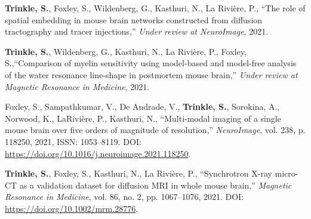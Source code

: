 \documentclass[10pt,letterpaper]{article}
\begin{document}
\begin{benumerate}{4}
\item \textbf{Trinkle, S.}, Foxley, S., Wildenberg, G., Kasthuri, N., La
  Rivi\`ere, P., ``The role of spatial embedding in mouse brain networks
  constructed from diffusion tractography and tracer injections,'' \textit{Under
    review at NeuroImage}, 2021.
\item \textbf{Trinkle, S.}, Wildenberg, G., Kasthuri, N., La Rivi\`ere, P.,
  Foxley, S.,``Comparison of myelin sensitivity using model-based and model-free
  analysis of the water resonance line-shape in postmortem mouse brain,''
  \textit{Under review at Magnetic Resonance in Medicine}, 2021.
\item Foxley, S., Sampathkumar, V., De Andrade, V., \textbf{Trinkle, S.},
  Sorokina, A., Norwood, K., LaRivi\`ere, P., Kasthuri, N., ``Multi-modal
  imaging of a single mouse brain over five orders of magnitude of resolution,''
  \textit{NeuroImage}, vol. 238, p. 118250, 2021, ISSN: 1053--8119. DOI:
  \href{https://doi.org/10.1016/j.neuroimage.2021.118250}{https://doi.org/10.1016/j.neuroimage.2021.118250}.
\item \textbf{Trinkle, S.}, Foxley, S., Kasthuri, N., La Rivi\`ere, P.,
  ``Synchrotron X-ray micro-CT as a validation dataset for diffusion MRI in
  whole mouse brain,'' \textit{Magnetic Resonance in Medicine}, vol. 86, no. 2,
  pp. 1067--1076, 2021. DOI:
  \href{https://doi.org/10.1002/mrm.28776}{https://doi.org/10.1002/mrm.28776}.
\end{benumerate}
\end{document}
